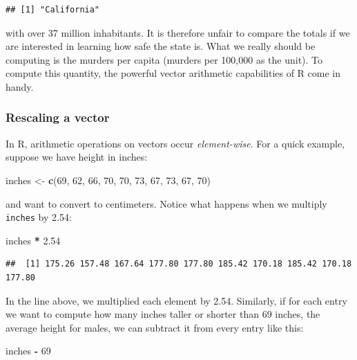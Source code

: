 \documentclass[
]{article}
\newenvironment{Shaded}{\begin{snugshade}}{\end{snugshade}}
\newcommand{\DecValTok}[1]{\textcolor[rgb]{0.00,0.00,0.81}{#1}}
\newcommand{\FloatTok}[1]{\textcolor[rgb]{0.00,0.00,0.81}{#1}}
\newcommand{\FunctionTok}[1]{\textcolor[rgb]{0.13,0.29,0.53}{\textbf{#1}}}
\newcommand{\NormalTok}[1]{#1}
\newcommand{\OtherTok}[1]{\textcolor[rgb]{0.56,0.35,0.01}{#1}}
\newcommand{\SpecialCharTok}[1]{\textcolor[rgb]{0.81,0.36,0.00}{\textbf{#1}}}
\begin{document}
\begin{verbatim}
## [1] "California"
\end{verbatim}

with over 37 million inhabitants. It is therefore unfair to compare the
totals if we are interested in learning how safe the state is. What we
really should be computing is the murders per capita (murders per
100,000 as the unit). To compute this quantity, the powerful vector
arithmetic capabilities of R come in handy.

\subsubsection{Rescaling a vector}\label{rescaling-a-vector}

In R, arithmetic operations on vectors occur \emph{element-wise}. For a
quick example, suppose we have height in inches:

\begin{Shaded}
\begin{Highlighting}[]
\NormalTok{inches }\OtherTok{\textless{}{-}} \FunctionTok{c}\NormalTok{(}\DecValTok{69}\NormalTok{, }\DecValTok{62}\NormalTok{, }\DecValTok{66}\NormalTok{, }\DecValTok{70}\NormalTok{, }\DecValTok{70}\NormalTok{, }\DecValTok{73}\NormalTok{, }\DecValTok{67}\NormalTok{, }\DecValTok{73}\NormalTok{, }\DecValTok{67}\NormalTok{, }\DecValTok{70}\NormalTok{)}
\end{Highlighting}
\end{Shaded}

and want to convert to centimeters. Notice what happens when we multiply
\texttt{inches} by 2.54:

\begin{Shaded}
\begin{Highlighting}[]
\NormalTok{inches }\SpecialCharTok{*} \FloatTok{2.54}
\end{Highlighting}
\end{Shaded}

\begin{verbatim}
##  [1] 175.26 157.48 167.64 177.80 177.80 185.42 170.18 185.42 170.18 177.80
\end{verbatim}

In the line above, we multiplied each element by 2.54. Similarly, if for
each entry we want to compute how many inches taller or shorter than 69
inches, the average height for males, we can subtract it from every
entry like this:

\begin{Shaded}
\begin{Highlighting}[]
\NormalTok{inches }\SpecialCharTok{{-}} \DecValTok{69}
\end{Highlighting}
\end{Shaded}
\end{document}
